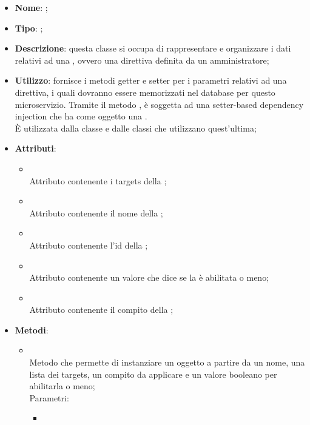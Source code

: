 \begin{itemize}
	\item \textbf{Nome}: ;
	\item \textbf{Tipo}: ;
	\item \textbf{Descrizione}: questa classe si occupa di rappresentare e organizzare i dati relativi ad una , ovvero una direttiva definita da un amministratore;
	\item \textbf{Utilizzo}: fornisce i metodi getter e setter per i parametri relativi ad una direttiva, i quali dovranno essere memorizzati nel database per questo microservizio. Tramite il metodo , è soggetta ad una setter-based dependency injection che ha come oggetto una . \\
È utilizzata dalla classe  e dalle classi che utilizzano quest'ultima;
	\item \textbf{Attributi}:
	\begin{itemize}
		\item[]  \\
		Attributo contenente i targets della ;
		\item[]  \\
		Attributo contenente il nome della ;
		\item[]  \\
		Attributo contenente l'id della ;
		\item[]  \\
		Attributo contenente un valore che dice se la  è abilitata o meno;
		\item[]  \\
		Attributo contenente il compito della ;
	\end{itemize}
	\item \textbf{Metodi}:
	\begin{itemize}
		\item[]  \\		Metodo che permette di instanziare un oggetto  a partire da un nome, una lista dei targets, un compito da applicare e un valore booleano per abilitarla o meno;\\
		Parametri:
		\begin{itemize}
			\item {} \\

\end{itemize}
\end{itemize}
\end{itemize}
